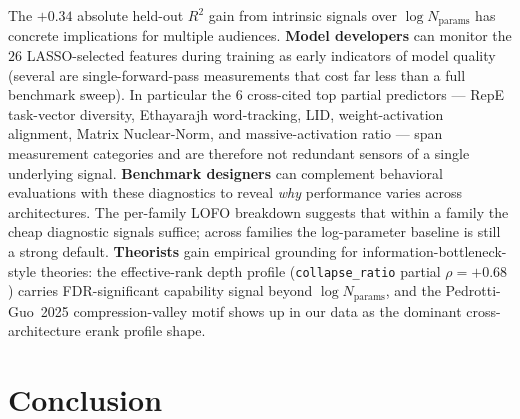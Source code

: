 \documentclass[preprint]{neurips_2025}
\begin{document}
The $+0.34$ absolute held-out $R^2$ gain from intrinsic signals over $\log N_{\text{params}}$ has concrete implications for multiple audiences.
\textbf{Model developers} can monitor the $26$ LASSO-selected features during training as early indicators of model quality (several are single-forward-pass measurements that cost far less than a full benchmark sweep). In particular the $6$ cross-cited top partial predictors --- RepE task-vector diversity, Ethayarajh word-tracking, LID, weight-activation alignment, Matrix Nuclear-Norm, and massive-activation ratio --- span measurement categories and are therefore not redundant sensors of a single underlying signal.
\textbf{Benchmark designers} can complement behavioral evaluations with these diagnostics to reveal \emph{why} performance varies across architectures. The per-family LOFO breakdown suggests that within a family the cheap diagnostic signals suffice; across families the log-parameter baseline is still a strong default.
\textbf{Theorists} gain empirical grounding for information-bottleneck-style theories: the effective-rank depth profile (\texttt{collapse\_ratio} partial $\rho = +0.68$) carries FDR-significant capability signal beyond $\log N_{\text{params}}$, and the Pedrotti-Guo~2025 compression-valley motif shows up in our data as the dominant cross-architecture erank profile shape.

\section{Conclusion}
\label{sec:conclusion}
\end{document}
